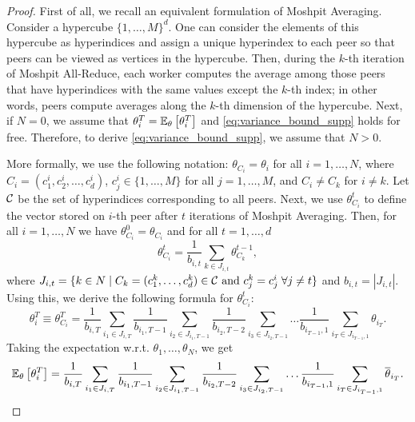 \begin{proof}
First of all, we recall an equivalent formulation of Moshpit Averaging. Consider a hypercube $\{1,\ldots,M\}^d$. One can consider the elements of this hypercube as hyperindices and assign a unique hyperindex to each peer so that peers can be viewed as vertices in the hypercube. Then, during the $k$-th iteration of Moshpit All-Reduce, each worker computes the average among those peers that have hyperindices with the same values except the $k$-th index; in other words, peers compute averages along the $k$-th dimension of the hypercube. Next, if $N = 0$, we assume that $\theta_i^T = \mathbb{E}_{\theta}\left[\theta_i^T\right]$ and \eqref{eq:variance_bound_supp} holds for free. Therefore, to derive \eqref{eq:variance_bound_supp}, we assume that $N > 0$.

More formally, we use the following notation: $\theta_{C_i} = \theta_i$ for all $i= 1,\ldots,N$, where $C_{i} = (c_{1}^i, c_2^i,\ldots, c_d^i)$, $c_{j}^i \in \{1,\ldots,M\}$ for all $j = 1,\ldots,M$, and $C_{i} \neq C_k$ for $i\neq k$. Let ${\cal C}$ be the set of hyperindices corresponding to all peers. Next, we use $\theta_{C_i}^t$ to define the vector stored on $i$-th peer after $t$ iterations of Moshpit Averaging. Then, for all $i = 1,\ldots,N$ we have $\theta_{C_i}^0 = \theta_{C_i}$ and for all $t = 1,\ldots,d$
\begin{equation*}
    \theta_{C_i}^{t} = \frac{1}{b_{i,t}}\sum\limits_{k\in J_{i,t}}\theta_{C_k}^{t-1},
\end{equation*}
where $J_{i,t} = \{k \in N\mid C_k = (c_1^k,\ldots,c_d^k) \in {\cal C} \text{ and } c_j^k = c_j^i\; \forall j \neq t\}$ and $b_{i,t} = |J_{i,t}|$. Using this, we derive the following formula for $\theta_{C_i}^t$:
\begin{equation*}
    \theta_i^T \equiv \theta_{C_i}^T = \frac{1}{b_{i,T}}\sum\limits_{i_1\in J_{i,T}}\frac{1}{b_{i_1,T-1}}\sum\limits_{i_2\in J_{i_1,T-1}}\frac{1}{b_{i_2,T-2}}\sum\limits_{i_3\in J_{i_2,T-1}}\ldots\frac{1}{b_{i_{T-1},1}}\sum\limits_{i_T\in J_{i_{T-1},1}}\theta_{i_{T}}.
\end{equation*}
Taking the expectation w.r.t. $\theta_1,\ldots,\theta_N$, we get
\begin{equation*}
    \mathbb{E}_{\theta}\left[\theta_i^T\right] = \frac{1}{b_{i,T}}\sum\limits_{i_1\in J_{i,T}}\frac{1}{b_{i_1,T-1}}\sum\limits_{i_2\in J_{i_1,T-1}}\frac{1}{b_{i_2,T-2}}\sum\limits_{i_3\in J_{i_2,T-1}}\ldots\frac{1}{b_{i_{T-1},1}}\sum\limits_{i_T\in J_{i_{T-1},1}}\overline{\theta}_{i_{T}}.
\end{equation*}

\end{proof}

